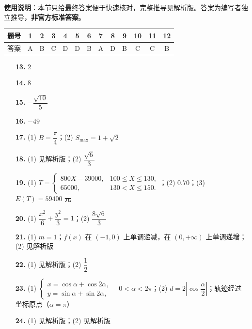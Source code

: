 
\begin{gknotice}
\textbf{使用说明}：本节只给最终答案便于快速核对，完整推导见解析版。答案为编写者独立推导，\textbf{非官方标准答案}。
\end{gknotice}

\begin{center}\begin{tabular}{ccccccccccccc}
\toprule
题号 & 1 & 2 & 3 & 4 & 5 & 6 & 7 & 8 & 9 & 10 & 11 & 12 \\
\midrule
答案 & A & B & C & D & D & B & A & D & B & C & C & B \\
\bottomrule
\end{tabular}\end{center}

\begin{itemize}[leftmargin=2.6em]
  \item[\textbf{13.}] $2$
  \item[\textbf{14.}] $8$
  \item[\textbf{15.}] $-\dfrac{\sqrt{10}}5$
  \item[\textbf{16.}] $-49$
\end{itemize}

\begin{itemize}[leftmargin=2.6em]
  \item[\textbf{17.}] (1) $B=\dfrac\pi4$；(2) $S_{\max}=1+\sqrt2$
  \item[\textbf{18.}] (1) 见解析版；(2) $\dfrac{\sqrt6}{3}$
  \item[\textbf{19.}] (1) $T=\begin{cases}800X-39000,&100\leqslant X\leqslant130,\\65000,&130<X\leqslant150.\end{cases}$；(2) $0.70$；(3) $E(T)=59400$ 元
  \item[\textbf{20.}] (1) $\dfrac{x^2}{6}+\dfrac{y^2}{3}=1$；(2) $\dfrac{8\sqrt6}{3}$
  \item[\textbf{21.}] (1) $m=1$；$f(x)$ 在 $(-1,0)$ 上单调递减，在 $(0,+\infty)$ 上单调递增；(2) 见解析版
  \item[\textbf{22.}] (1) 见解析版；(2) $\dfrac12$
  \item[\textbf{23.}] (1) $\begin{cases}x=\cos\alpha+\cos2\alpha,\\y=\sin\alpha+\sin2\alpha,\end{cases}\quad0<\alpha<2\pi$；(2) $d=2\left|\cos\dfrac\alpha2\right|$；轨迹经过坐标原点（$\alpha=\pi$）
  \item[\textbf{24.}] (1) 见解析版；(2) 见解析版
\end{itemize}
